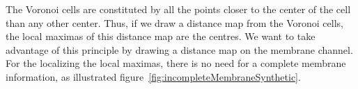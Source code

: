The Voronoi cells are constituted by all the points closer to the center of the cell than any other center. Thus, if we draw a distance map from the Voronoi cells, the local maximas of this distance map are the centres.
We want to take advantage of this principle by drawing a distance map on the membrane channel. For the localizing the local maximas, there is no need for a complete membrane information, as illustrated figure~\ref{fig:incompleteMembraneSynthetic}.
\begin{figure}[h]
  \centering
{}
\\

\end{figure}
